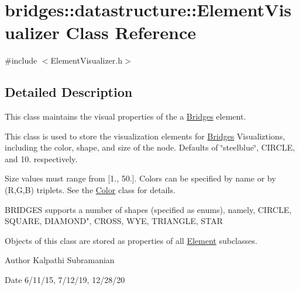 \hypertarget{classbridges_1_1datastructure_1_1_element_visualizer}{}\section{bridges\+:\+:datastructure\+:\+:Element\+Visualizer Class Reference}
\label{classbridges_1_1datastructure_1_1_element_visualizer}


{\ttfamily \#include $<$Element\+Visualizer.\+h$>$}



\subsection{Detailed Description}
This class maintains the visual properties of the a \hyperlink{classbridges_1_1_bridges}{Bridges} element. 

This class is used to store the visualization elements for \hyperlink{classbridges_1_1_bridges}{Bridges} Visualiztions, including the color, shape, and size of the node. Defaults of \char`\"{}steelblue\char`\"{}, C\+I\+R\+C\+LE, and 10. respectively.

Size values must range from \mbox{[}1., 50.\mbox{]}. Colors can be specified by name or by (R,G,B) triplets. See the \hyperlink{classbridges_1_1datastructure_1_1_color}{Color} class for details.

B\+R\+I\+D\+G\+ES supports a number of shapes (specified as enums), namely, C\+I\+R\+C\+LE, S\+Q\+U\+A\+RE, D\+I\+A\+M\+O\+ND", C\+R\+O\+SS, W\+YE, T\+R\+I\+A\+N\+G\+LE, S\+T\+AR

Objects of this class are stored as properties of all \hyperlink{classbridges_1_1datastructure_1_1_element}{Element} subclasses.

\begin{DoxyAuthor}{Author}
Kalpathi Subramanian 
\end{DoxyAuthor}
\begin{DoxyDate}{Date}
6/11/15, 7/12/19, 12/28/20 
\end{DoxyDate}
